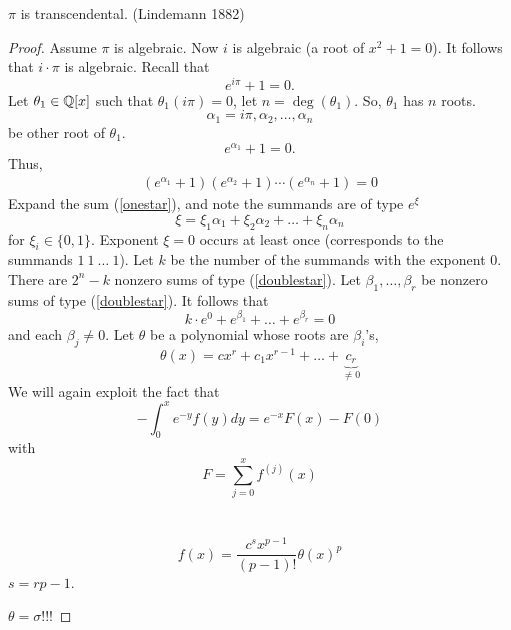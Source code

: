 \documentclass[NumTh.tex]{subfiles}
\begin{document}
\begin{theorem}
  $\pi$ is transcendental. (Lindemann 1882)
\end{theorem}

\begin{proof}
  Assume $\pi$ is algebraic.
  Now $i$ is algebraic (a root of $x^2+1 = 0$).
  It follows that $i \cdot \pi$ is algebraic.
  Recall that
  \[ e^{i \pi} +1 = 0 \text{.} \]
  Let $\theta_1 \in \mathbb{Q}[x]$ such that $\theta_1(i \pi) = 0$,
  let $n = \deg(\theta_1)$.
  So, $\theta_1$ has $n$ roots.
  \[ \alpha_1 = i \pi, \alpha_2,\dots,\alpha_n \]
  be other root of $\theta_1$.
  \[ e^{\alpha_1} + 1 = 0 \text{.} \]
  Thus,
  \begin{align}\label{onestar}
    (e^{\alpha_1} + 1)(e^{\alpha_2} + 1) \cdots (e^{\alpha_n} + 1) = 0
  \end{align}
  Expand the sum (\ref{onestar}), and note the summands are of type $e^\xi$
  \[ \xi = \xi_1 \alpha_1 + \xi_2 \alpha_2 + \dots + \xi_n \alpha_n \]
  for $\xi_i \in \{0,1\}$.
  Exponent $\xi = 0$ occurs at least once (corresponds to the summands $1 \: 1 \: \dots \: 1$).
  Let $k$ be the number of the summands with the exponent $0$.
  There are $2^n-k$ nonzero sums of type (\ref{doublestar}).
  Let $\beta_1,\dots,\beta_r$ be nonzero sums of type (\ref{doublestar}).
  It follows that 
  \[ k \cdot e^0 + e^{\beta_1} + \dots + e^{\beta_r} = 0 \]
  and each $\beta_j \neq 0$.
  Let $\theta$ be a polynomial whose roots are $\beta_i$'s,
  \[ \theta(x) = c x^r + c_1 x^{r-1} + \dots + \underbrace{c_r}_{\neq 0} \]
  We will again exploit the fact that 
  \[ - \int_0^x e^{-y} f(y) dy = e^{-x} F(x) - F(0) \]
  with
  \[ F = \sum_{j=0}^x f^{(j)}(x) \]
  \\
  \\
  \[ f(x) = \frac{c^s x^{p-1}}{(p-1)!} \theta(x)^p \]
  $s = rp -1$.
  
  $\theta = \sigma$!!!
\end{proof}
\end{document}

